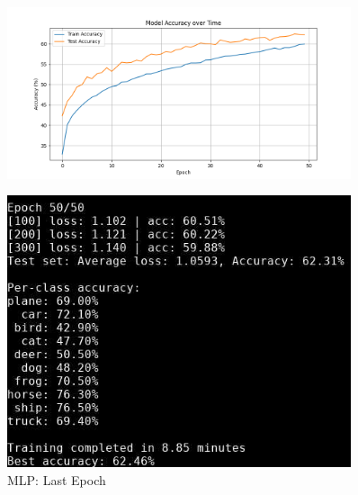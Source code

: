 \documentclass{beamer}
\begin{document}
\begin{frame}
\begin{columns}
    \begin{column}{0.5\textwidth}
        \begin{figure}[t]
            \centering
            \vspace{-0.4cm}
            \includegraphics[width=0.9\textwidth]{media/cifar10_mlp_accuracy.png}
        \end{figure}
        \vspace{-0.8cm}
        \begin{figure}[t]
            \centering
            \includegraphics[width=0.9\textwidth]{media/mlp_epoch_50.png}
            \vspace{-0.3cm}
            \caption{MLP: Last Epoch}
        \end{figure}
    \end{column}
\end{columns}
\end{frame}
\end{document}
